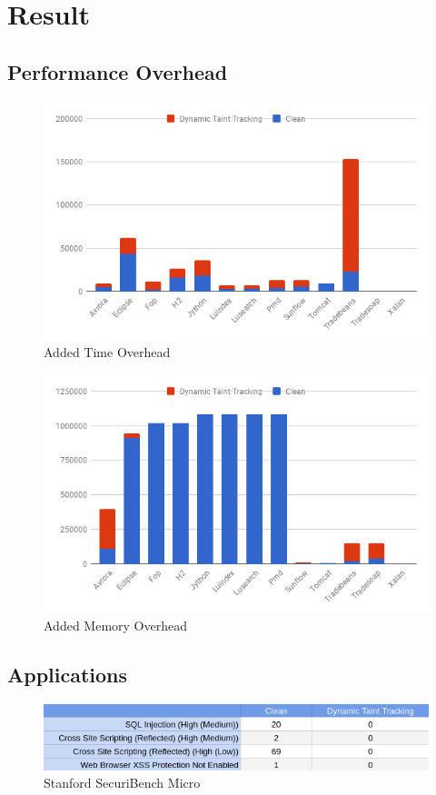 \chapter{Result}

\section{Performance Overhead}
\begin{figure}[!h]
	\centering
	\includegraphics[width=\textwidth]{images/Time.png}
	\caption{Added Time Overhead}
	\label{fig:Time}
\end{figure}

\begin{figure}[!h]
	\centering
	\includegraphics[width=\textwidth]{images/Memory.png}
	\caption{Added Memory Overhead}
	\label{fig:Memory}
\end{figure}


\section{Applications}
\begin{figure}[!h]
	\centering
	\includegraphics[width=\textwidth]{images/Micro.png}
	\caption{Stanford SecuriBench Micro}
	\label{fig:Micro}
\end{figure}

